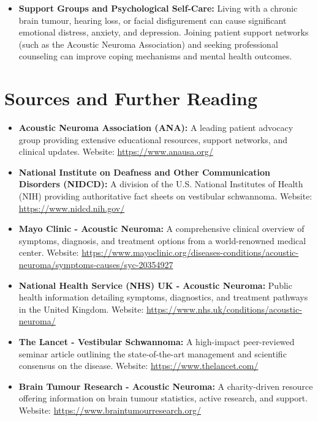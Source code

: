 \begin{itemize}
\begin{itemize}
        \item \textit{Cochlear Implantation:} Increasingly considered, especially in patients with NF2 or bilateral hearing loss, to directly stimulate the auditory nerve.
    \end{itemize}
    \item \textbf{Support Groups and Psychological Self-Care:} Living with a chronic brain tumour, hearing loss, or facial disfigurement can cause significant emotional distress, anxiety, and depression. Joining patient support networks (such as the Acoustic Neuroma Association) and seeking professional counseling can improve coping mechanisms and mental health outcomes.
\end{itemize}

\section*{Sources and Further Reading}
\begin{itemize}
    \item \textbf{Acoustic Neuroma Association (ANA):} A leading patient advocacy group providing extensive educational resources, support networks, and clinical updates. Website: \url{https://www.anausa.org/}
    \item \textbf{National Institute on Deafness and Other Communication Disorders (NIDCD):} A division of the U.S. National Institutes of Health (NIH) providing authoritative fact sheets on vestibular schwannoma. Website: \url{https://www.nidcd.nih.gov/}
    \item \textbf{Mayo Clinic - Acoustic Neuroma:} A comprehensive clinical overview of symptoms, diagnosis, and treatment options from a world-renowned medical center. Website: \url{https://www.mayoclinic.org/diseases-conditions/acoustic-neuroma/symptoms-causes/syc-20354927}
    \item \textbf{National Health Service (NHS) UK - Acoustic Neuroma:} Public health information detailing symptoms, diagnostics, and treatment pathways in the United Kingdom. Website: \url{https://www.nhs.uk/conditions/acoustic-neuroma/}
    \item \textbf{The Lancet - Vestibular Schwannoma:} A high-impact peer-reviewed seminar article outlining the state-of-the-art management and scientific consensus on the disease. Website: \url{https://www.thelancet.com/}
    \item \textbf{Brain Tumour Research - Acoustic Neuroma:} A charity-driven resource offering information on brain tumour statistics, active research, and support. Website: \url{https://www.braintumourresearch.org/}
\end{itemize}
